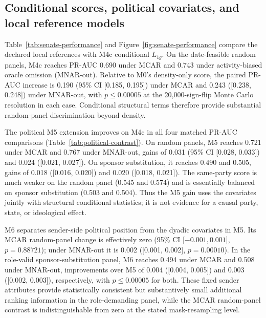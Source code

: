\documentclass{nws}
\begin{document}
\subsection{Conditional scores, political covariates, and local reference models}\label{sec:footprint-results}

Table~\ref{tab:senate-performance} and Figure~\ref{fig:senate-performance} compare the declared local references with M4c conditional $L_{1g}$. On the date-feasible random panels, M4c reaches PR-AUC 0.690 under MCAR and 0.743 under activity-biased oracle omission (MNAR-out). Relative to M0's density-only score, the paired PR-AUC increase is 0.190 (95\% CI [0.185, 0.195]) under MCAR and 0.243 ([0.238, 0.248]) under MNAR-out, with $p\leq0.00005$ at the 20,000-sign-flip Monte Carlo resolution in each case. Conditional structural terms therefore provide substantial random-panel discrimination beyond density.

The political M5 extension improves on M4c in all four matched PR-AUC comparisons (Table~\ref{tab:political-contrast}). On random panels, M5 reaches 0.721 under MCAR and 0.767 under MNAR-out, gains of 0.031 (95\% CI [0.028, 0.033]) and 0.024 ([0.021, 0.027]). On sponsor substitution, it reaches 0.490 and 0.505, gains of 0.018 ([0.016, 0.020]) and 0.020 ([0.018, 0.021]). The same-party score is much weaker on the random panel (0.545 and 0.574) and is essentially balanced on sponsor substitution (0.503 and 0.504). Thus the M5 gain uses the covariates jointly with structural conditional statistics; it is not evidence for a causal party, state, or ideological effect.

M6 separates sender-side political position from the dyadic covariates in M5. Its MCAR random-panel change is effectively zero (95\% CI [$-0.001,0.001$], $p=0.88721$); under MNAR-out it is 0.002 ([0.001, 0.002], $p=0.00010$). In the role-valid sponsor-substitution panel, M6 reaches 0.494 under MCAR and 0.508 under MNAR-out, improvements over M5 of 0.004 ([0.004, 0.005]) and 0.003 ([0.002, 0.003]), respectively, with $p\leq0.00005$ for both. These fixed sender attributes provide statistically consistent but substantively small additional ranking information in the role-demanding panel, while the MCAR random-panel contrast is indistinguishable from zero at the stated mask-resampling level.



\end{document}
